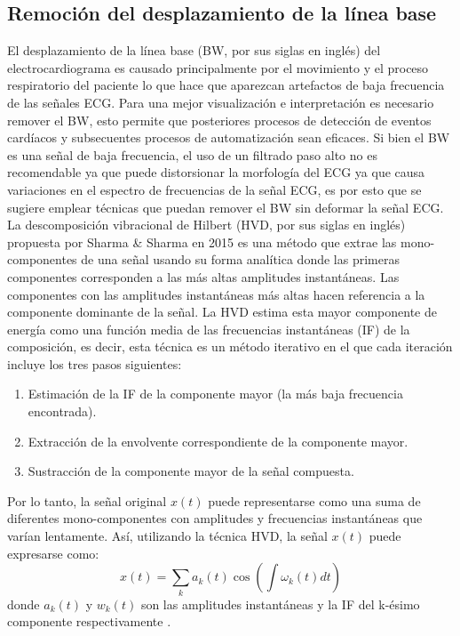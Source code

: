 \documentclass[12pt,letterpaper,oneside,openright]{book}
\begin{document}
\subsection{Remoción del desplazamiento de la línea base}

El desplazamiento de la línea base (BW, por sus siglas en inglés) del electrocardiograma es causado principalmente por el movimiento y el proceso respiratorio del paciente lo que hace que aparezcan artefactos de baja frecuencia de las señales ECG. Para una mejor visualización e interpretación es necesario remover el BW, esto permite que posteriores procesos de detección de eventos cardíacos y subsecuentes procesos de automatización sean eficaces. Si bien el BW es una señal de baja frecuencia, el uso de un filtrado paso alto no es recomendable ya que puede distorsionar la morfología del ECG ya que causa variaciones en el espectro de frecuencias de la señal ECG, es por esto que se sugiere emplear técnicas que puedan remover el BW sin deformar la señal ECG. La descomposición vibracional de Hilbert (HVD, por sus siglas en inglés) propuesta por Sharma \& Sharma en 2015 \cite{Sharma15} es una método que extrae las mono-componentes de una señal usando su forma analítica donde las primeras componentes corresponden a las más altas amplitudes instantáneas. Las componentes con las amplitudes instantáneas más altas hacen referencia a la componente dominante de la señal. La HVD estima esta mayor componente de energía como una función media de las frecuencias instantáneas (IF) de la composición, es decir, esta técnica es un método iterativo en el que cada iteración incluye los tres pasos siguientes: 
\begin{enumerate}
	\item Estimación de la IF de la componente mayor (la más baja frecuencia encontrada).
	\item Extracción de la envolvente correspondiente de la componente mayor. 
	\item Sustracción de la componente mayor de la señal compuesta.
\end{enumerate}
Por lo tanto, la señal original $x(t)$ puede representarse como una suma de diferentes mono-componentes con amplitudes y frecuencias instantáneas que varían lentamente. Así, utilizando la técnica HVD, la señal $x(t)$ puede expresarse como: 
\begin{equation}
	x(t) = \sum_k a_k(t)\cos\left( \int \omega_k(t)dt\right)
	\label{eq:senal_HVD}
\end{equation}
donde $a_k(t)$ y $w_k(t)$ son las amplitudes instantáneas y la IF del k-ésimo componente respectivamente \cite{Sharma15}. 
\end{document}
